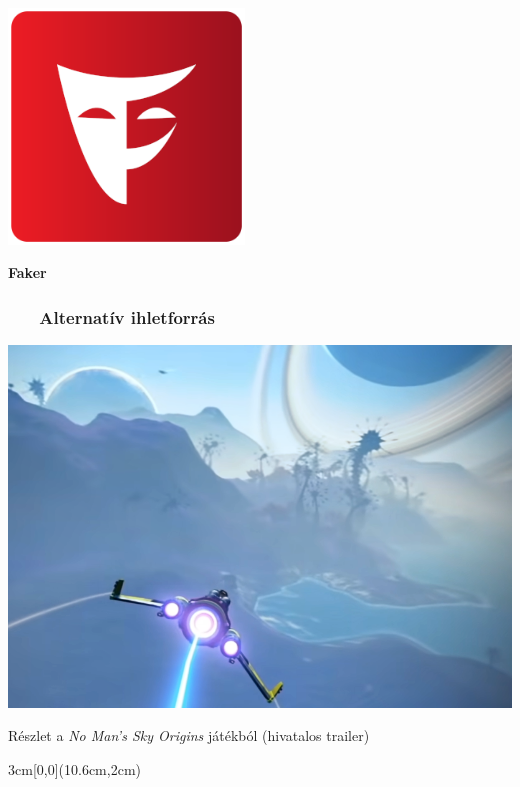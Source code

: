 \documentclass[
    aspectratio=169,
]{beamer}
\newcommand{\slidetitle}[2]{\frametitle{{\small #1 ~ \ding{226} ~ } \normalsize \textbf{#2} }}
\begin{document}
\begin{frame}[fragile]
\begin{minipage}[c]{0.35\textwidth}
        \pause
        
        \vspace{10pt}
        
        \includegraphics[width=0.47\textwidth, frame]{image/faker}\par
        \textbf{Faker}
        
    \end{minipage}%
    \hspace*{\fill}%
\end{frame}

\begin{frame}
    \slidetitle{\sectionshorttitle}{Alternatív ihletforrás}
    
    \centering
    
    \includegraphics[height=0.8\textheight]{image/nomanssky}
    
    \smallskip
    
    \footnotesize{Részlet a \textit{No Man's Sky Origins} játékból (hivatalos trailer)}
    
    \begin{textblock*}{3cm}[0,0](10.6cm,2cm)
        \begin{overprint}
        \end{overprint}
    \end{textblock*}
\end{frame}
\end{document}
